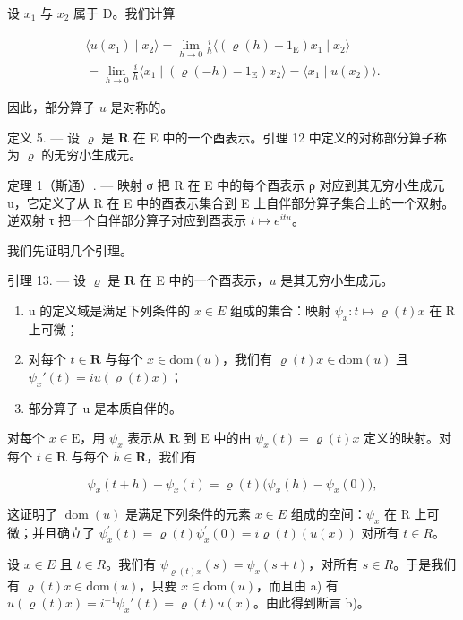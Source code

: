 设 \(x_{1}\) 与 \(x_{2}\) 属于 D。我们计算

\[
\begin{array}{c} \langle u (x _ {1}) \mid x _ {2} \rangle = \lim _ {h \to 0} \frac {i}{h} \langle (\varrho (h) - 1 _ {\mathrm{E}}) x _ {1} \mid x _ {2} \rangle \\ = \lim _ {h \to 0} \frac {i}{h} \langle x _ {1} \mid (\varrho (- h) - 1 _ {\mathrm{E}}) x _ {2} \rangle = \langle x _ {1} \mid u (x _ {2}) \rangle . \end{array}
\]

因此，部分算子 \(u\) 是对称的。

定义 5. --- 设 \(\varrho\) 是 \(\mathbf{R}\) 在 E 中的一个酉表示。引理 12 中定义的对称部分算子称为 \(\varrho\) 的无穷小生成元。

定理 1（斯通）. --- 映射 σ 把 R 在 E 中的每个酉表示 ρ 对应到其无穷小生成元 u，它定义了从 R 在 E 中的酉表示集合到 E 上自伴部分算子集合上的一个双射。逆双射 τ 把一个自伴部分算子对应到酉表示 \(t \mapsto e^{itu}\)。

我们先证明几个引理。

引理 13. --- 设 \(\varrho\) 是 \(\mathbf{R}\) 在 E 中的一个酉表示，\(u\) 是其无穷小生成元。

\begin{enumerate}
\def\labelenumi{\alph{enumi})}
\item
  u 的定义域是满足下列条件的 \(x \in E\) 组成的集合：映射 \(\psi_{x} \colon t \mapsto \varrho(t)x\) 在 R 上可微；
\item
  对每个 \(t \in \mathbf{R}\) 与每个 \(x \in \mathrm{dom}(u)\)，我们有 \(\varrho(t)x \in \mathrm{dom}(u)\) 且 \(\psi_x'(t) = i u(\varrho(t)x)\)；
\item
  部分算子 u 是本质自伴的。
\end{enumerate}

对每个 \(x \in \mathrm{E}\)，用 \(\psi_x\) 表示从 \(\mathbf{R}\) 到 \(\mathrm{E}\) 中的由 \(\psi_x(t) = \varrho(t)x\) 定义的映射。对每个 \(t \in \mathbf{R}\) 与每个 \(h \in \mathbf{R}\)，我们有

\[
\psi_ {x} (t + h) - \psi_ {x} (t) = \varrho (t) \big (\psi_ {x} (h) - \psi_ {x} (0) \big),
\]

这证明了 \(\operatorname{dom}(u)\) 是满足下列条件的元素 \(x \in E\) 组成的空间：\(\psi_{x}\) 在 R 上可微；并且确立了 \(\psi_{x}^{\prime}(t) = \varrho(t)\psi_{x}^{\prime}(0) = i\varrho(t)(u(x))\) 对所有 \(t \in R\)。

设 \(x \in E\) 且 \(t \in R\)。我们有 \(\psi_{\varrho(t)x}(s) = \psi_x(s + t)\)，对所有 \(s \in R\)。于是我们有 \(\varrho(t)x \in \text{dom}(u)\)，只要 \(x \in \text{dom}(u)\)，而且由 a) 有 \(u(\varrho(t)x) = i^{-1}\psi_x'(t) = \varrho(t)u(x)\)。由此得到断言 b)。

